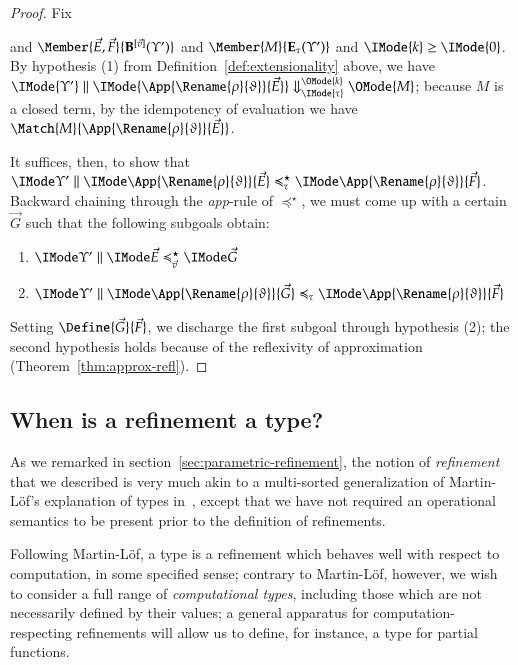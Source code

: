 \documentclass[11pt]{article}
\theoremstyle{definition}
\theoremstyle{notation}
\theoremstyle{remark}
\numberwithin{equation}{section}
\newcommand\EvalN[5]{\IMode{#1}\parallel\IMode{#4}\Downarrow^{\OMode{#3}}_{\IMode{#2}}\OMode{#5}}
\newcommand\Exprs{\mathbf{E}}
\newcommand\BTms{\mathbf{B}}
\begin{document}
\begin{proof}
  Fix
  and $\Member{\vec{E},\vec{F}}{\BTms^{[\vec{v}]}(\Upsilon')}$ and
  $\Member{M}{\Exprs_\tau(\Upsilon')}$ and $\IMode{k}\geq\IMode{0}$.
  By hypothesis (1) from Definition~\ref{def:extensionality} above, we have
  $\EvalN{\Upsilon'}{\tau}{k}{\App{\Rename{\rho}{\vartheta}}{\vec{E}}}{M}$;
  because $M$ is a closed term, by the idempotency of evaluation we have
  $\Match{M}{\App{\Rename{\rho}{\vartheta}}{\vec{E}}}$.

  It suffices, then, to show that
  $\PBinRel{\preccurlyeq^\star_\tau}{\Upsilon'}{\App{\Rename{\rho}{\vartheta}}{\vec{E}}}{\App{\Rename{\rho}{\vartheta}}{\vec{F}}}$.
  Backward chaining through the \textit{app}-rule of $\preccurlyeq^\star$, we must
  come up with a certain $\vec{G}$ such that the following subgoals obtain:
  \begin{enumerate}
    \item $\PBinRel{\preccurlyeq^\star_{\vec{v}}}{\Upsilon'}{\vec{E}}{\vec{G}}$
    \item $\PBinRel{\preccurlyeq_\tau}{\Upsilon'}{\App{\Rename{\rho}{\vartheta}}{\vec{G}}}{\App{\Rename{\rho}{\vartheta}}{\vec{F}}}$
  \end{enumerate}

  Setting $\Define{\vec{G}}{\vec{F}}$, we discharge the first subgoal through
  hypothesis (2); the second hypothesis holds because of the reflexivity of
  approximation (Theorem~\ref{thm:approx-refl}).

\end{proof}

\subsection{When is a refinement a type?}

As we remarked in section~\ref{sec:parametric-refinement}, the notion of
\emph{refinement} that we described is very much akin to a multi-sorted
generalization of Martin-L\"of's explanation of types
in~\cite{martin-lof:1979}, except that we have not required an operational
semantics to be present prior to the definition of refinements.

Following Martin-L\"of, a type is a refinement which behaves well with respect
to computation, in some specified sense; contrary to Martin-L\"of, however, we wish to
consider a full range of \emph{computational types}, including those which are
not necessarily defined by their values; a general apparatus for
computation-respecting refinements will allow us to define, for instance, a
type for partial functions.
\end{document}
